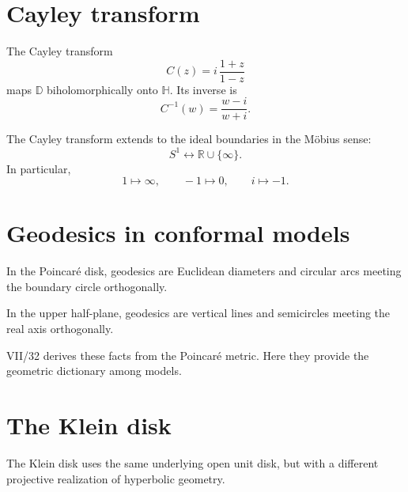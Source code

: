 \section{Cayley transform}

\begin{theorem}\label{thm:vii31-cayley}
The Cayley transform
\[
C(z)
=
i\,\frac{1+z}{1-z}
\]
maps \(\mathbb D\) biholomorphically onto \(\mathbb H\).  Its inverse is
\[
C^{-1}(w)
=
\frac{w-i}{w+i}.
\]
\end{theorem}

\begin{proposition}\label{prop:vii31-boundary-map}
The Cayley transform extends to the ideal boundaries in the Möbius sense:
\[
S^1
\longleftrightarrow
\mathbb R\cup\{\infty\}.
\]
In particular,
\[
1\mapsto\infty,\qquad
-1\mapsto0,\qquad
i\mapsto-1.
\]
\end{proposition}

\section{Geodesics in conformal models}

\begin{theorem}\label{thm:vii31-disk-geodesics}
In the Poincaré disk, geodesics are Euclidean diameters and circular arcs meeting
the boundary circle orthogonally.
\end{theorem}

\begin{theorem}\label{thm:vii31-half-geodesics}
In the upper half-plane, geodesics are vertical lines and semicircles meeting the
real axis orthogonally.
\end{theorem}

\begin{remark}
VII/32 derives these facts from the Poincaré metric.  Here they provide the
geometric dictionary among models.
\end{remark}

\section{The Klein disk}

\begin{definition}\label{def:vii31-klein}
The Klein disk uses the same underlying open unit disk, but with a different
projective realization of hyperbolic geometry.
\end{definition}

